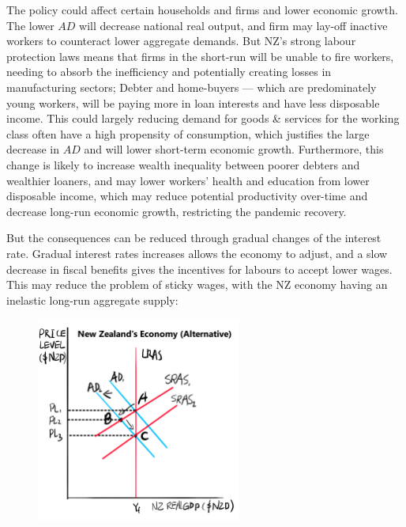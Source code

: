 \documentclass[a4paper,12pt]{article}
\begin{document}

The policy could affect certain households and firms and lower economic growth. The lower $AD$ will decrease national real output, and firm may lay-off inactive workers to counteract lower aggregate demands. But NZ's strong labour protection laws means that firms in the short-run will be unable to fire workers, needing to absorb the inefficiency and potentially creating losses in manufacturing sectors; Debter and home-buyers --- which are predominately young workers, will be paying more in loan interests and have less disposable income. This could largely reducing demand for goods \& services for the working class often have a high propensity of consumption, which justifies the large decrease in $AD$ and will lower short-term economic growth. Furthermore, this change is likely to increase wealth inequality between poorer debters and wealthier loaners, and may lower workers' health and education from lower disposable income, which may reduce potential productivity over-time and decrease long-run economic growth, restricting the pandemic recovery.


But the consequences can be reduced through gradual changes of the interest rate. Gradual interest rates increases allows the economy to adjust, and a slow decrease in fiscal benefits gives the incentives for labours to accept lower wages. This may reduce the problem of sticky wages, with the NZ economy having an inelastic long-run aggregate supply:

\begin{figure}[H]
    \centering
    \includegraphics[width=0.6\textwidth]{assets/macro_alt.png}
\end{figure}
\end{document}
